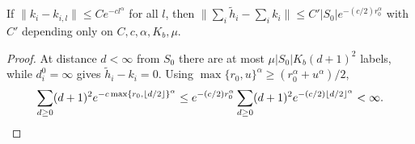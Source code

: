 \begin{lemma}
    \label{lem:al_truncation_error}
    \leanok
    If $\|k_i-k_{i,l}\|\le Ce^{-cl^\alpha}$ for all $l$, then
    $\|\sum_i\widetilde h_i-\sum_ik_i\|\le C'|S_0|e^{-(c/2)r_0^\alpha}$ with $C'$
    depending only on $C,c,\alpha,K_b,\mu$.
\end{lemma}
\begin{proof}\leanok
    At distance $d<\infty$ from $S_0$ there are at most $\mu|S_0|K_b(d+1)^2$
    labels, while $d_i^0=\infty$ gives $\widetilde h_i-k_i=0$. Using
    $\max\{r_0,u\}^\alpha\ge(r_0^\alpha+u^\alpha)/2$,
    \begin{align}
        \sum_{d\ge0}(d+1)^2e^{-c\max\{r_0,\lfloor d/2\rfloor\}^\alpha}
        \le e^{-(c/2)r_0^\alpha}\sum_{d\ge0}(d+1)^2e^{-(c/2)\lfloor d/2\rfloor^\alpha}
        <\infty.
        \notag
    \end{align}
\end{proof}

